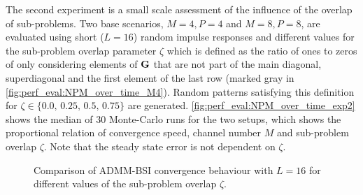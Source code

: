 \documentclass{article}
\begin{document}
The second experiment is a small scale assessment of the influence of the overlap of sub-problems.
Two base scenarios, \(M=4,P=4\) and \(M=8,P=8\), are evaluated using short (\(L=16\)) random impulse responses and different values for the sub-problem overlap parameter \(\zeta\) which is defined as the ratio of ones to zeros of only considering elements of \(\bm{\mathrm{G}}\) that are not part of the main diagonal, superdiagonal and the first element of the last row (marked gray in \autoref{fig:perf_eval:NPM_over_time_M4}).
Random patterns satisfying this definition for \(\zeta \in \{0.0,\,0.25,\,0.5,\,0.75\}\) are generated.
\autoref{fig:perf_eval:NPM_over_time_exp2} shows the median of 30 Monte-Carlo runs for the two setups, which shows the proportional relation of convergence speed, channel number \(M\) and sub-problem overlap \(\zeta\).
Note that the steady state error is not dependent on \(\zeta\).

\begin{figure}
    \centering
    \hspace*{-0.1cm}
    \hspace*{-0.0cm}
    \vspace*{-0.3cm}
    \caption{Comparison of ADMM-BSI convergence behaviour with \(L\!=\!16\) for different values of the sub-problem overlap \(\zeta\).}
    \label{fig:perf_eval:NPM_over_time_exp2}
\end{figure}
\end{document}
